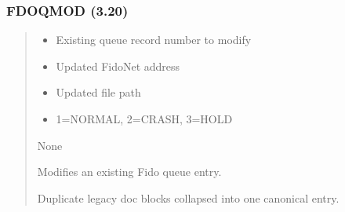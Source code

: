 \documentclass[letterpaper,10pt,english]{sphinxmanual}
\begin{document}
\subsubsection{FDOQMOD (3.20)}
\label{\detokenize{ppl:fdoqmod-3-20}}\begin{quote}

\sphinxAtStartPar
{}
\begin{description}
\begin{itemize}
\item {} 
\sphinxAtStartPar
{} \textendash{} Existing queue record number to modify

\item {} 
\sphinxAtStartPar
{}   \textendash{} Updated FidoNet address

\item {} 
\sphinxAtStartPar
{}   \textendash{} Updated file path

\item {} 
\sphinxAtStartPar
{}  \textendash{} 1=NORMAL, 2=CRASH, 3=HOLD

\end{itemize}

\sphinxAtStartPar
None

\sphinxAtStartPar
Modifies an existing Fido queue entry.

\end{description}

\sphinxAtStartPar
{}
\begin{quote}

\begin{sphinxVerbatim}[commandchars=\\\{\}]
 
\end{sphinxVerbatim}
\end{quote}
\begin{description}
\sphinxAtStartPar
Duplicate legacy doc blocks collapsed into one canonical entry.


\end{description}
\end{quote}
\end{document}
